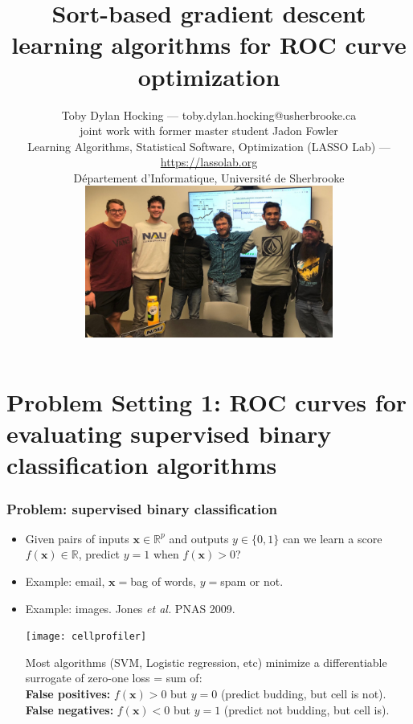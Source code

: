 \documentclass[t]{beamer}
\begin{document}
\title{Sort-based gradient descent learning algorithms for ROC curve optimization}
 
\author{
  Toby Dylan Hocking --- toby.dylan.hocking@usherbrooke.ca\\ 
  joint work with former master student Jadon Fowler\\
  Learning Algorithms, Statistical Software, Optimization (LASSO Lab) --- \url{https://lassolab.org}\\
  Département d'Informatique, Université de Sherbrooke\\
  \includegraphics[height=5cm]{2023-02-02-group-meeting} \\
}

\date{}

\maketitle

\section{Problem Setting 1: ROC curves for evaluating supervised  binary classification algorithms}

\begin{frame}
  \frametitle{Problem: supervised binary classification}
  
  \begin{itemize}
  \item Given pairs of inputs $\mathbf x\in\mathbb R^p$ and outputs
    $y\in\{0,1\}$ can we learn a score 
    $f(\mathbf x)\in\mathbb R$, predict $y=1$ when $f(\mathbf x)>0$?
  \item Example: email, $\mathbf x =$bag of words, $y=$spam or not.
  \item Example: images. Jones {\it et al.} PNAS 2009.
    \parbox{2in}{\texttt{[image: cellprofiler]}}
    \parbox{1.9in}{Most algorithms (SVM, Logistic regression, etc) minimize a differentiable surrogate of zero-one loss = sum of:\\
      \textbf{False positives:} $f(\mathbf x)>0$ but $y=0$ (predict
      budding, but cell is not).\\
      \textbf{False negatives:} $f(\mathbf x)<0$ but $y=1$ (predict
      not budding, but cell is).  }
  \end{itemize} 
\end{frame}
\end{document}

